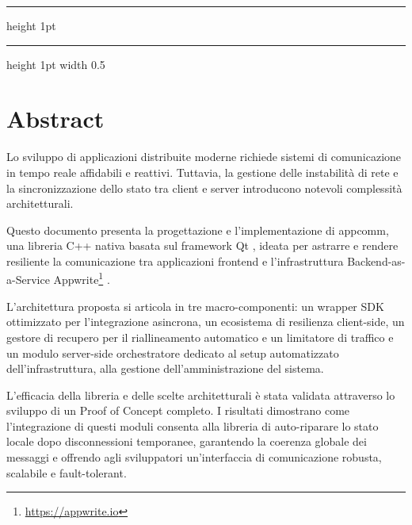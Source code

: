 \documentclass[a4paper, 11pt, twoside]{report}
\newif\ifshowlogo
\newcommand{\blankpage}{
    \clearpage
    \thispagestyle{empty}     %
    \showlogofalse            %
    \hbox{}                   %
    \newpage
    \showlogotrue             %
}
\begin{document}
\begin{titlepage}
\vspace{35pt}
\hrule height 1pt %
\vspace{8pt}

\noindent
{}
\vspace{5cm}                          %
\hrule height 1pt width 0.5\textwidth %
\vspace{8pt}
\noindent
\begin{minipage}[t]{\textwidth}
    \vspace{0pt}
\end{minipage}
\end{titlepage}
\restoregeometry

\blankpage

\tableofcontents
\newpage

\listoffigures
\blankpage
\listoftables
\newpage

\blankpage

\chapter{Abstract}

Lo sviluppo di applicazioni distribuite moderne richiede sistemi di comunicazione in tempo reale affidabili e reattivi. 
Tuttavia, la gestione delle instabilità di rete e la sincronizzazione dello stato tra client e server introducono notevoli
complessità architetturali.

Questo documento presenta la progettazione e l'implementazione di appcomm, una libreria C++ nativa basata sul framework 
Qt \cite{qt_docs}, ideata per astrarre e rendere resiliente la comunicazione tra applicazioni frontend e l'infrastruttura 
Backend-as-a-Service Appwrite\footnote{\url{https://appwrite.io}} \cite{appwrite_docs}.

L'architettura proposta si articola in tre macro-componenti: un wrapper SDK ottimizzato per l'integrazione asincrona,
un ecosistema di resilienza client-side, un gestore di recupero per il riallineamento automatico e un limitatore di traffico 
e un modulo server-side orchestratore dedicato al setup automatizzato dell'infrastruttura, alla gestione 
dell'amministrazione del sistema.

L'efficacia della libreria e delle scelte architetturali è stata validata attraverso lo sviluppo di un Proof of Concept
completo. I risultati dimostrano come l'integrazione di questi moduli consenta alla libreria di auto-riparare lo stato locale
dopo disconnessioni temporanee, garantendo la coerenza globale dei messaggi e offrendo agli sviluppatori un'interfaccia di
comunicazione robusta, scalabile e fault-tolerant.
\end{document}
